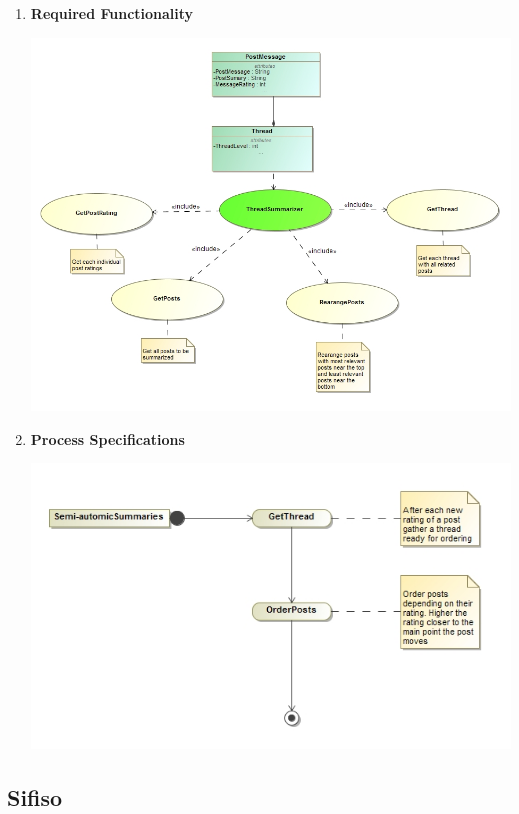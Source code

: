\documentclass[11pt]{article}
\begin{document}
\begin{enumerate}
			 \item	\textbf{Required Functionality}
			 	  		\begin{center}
			 	  			\includegraphics[scale=0.5]{Diagrams/B3 UseCase.png}
			 	  		\end{center}
	\newpage
			 \item \textbf{Process Specifications}
			 	  		\begin{center}
			 	  			\includegraphics[scale=0.5]{Diagrams/B3 Activity.png}
			 	  		\end{center}
			 
				
\end{enumerate}

\newpage

\subsection{Sifiso}
\end{document}
